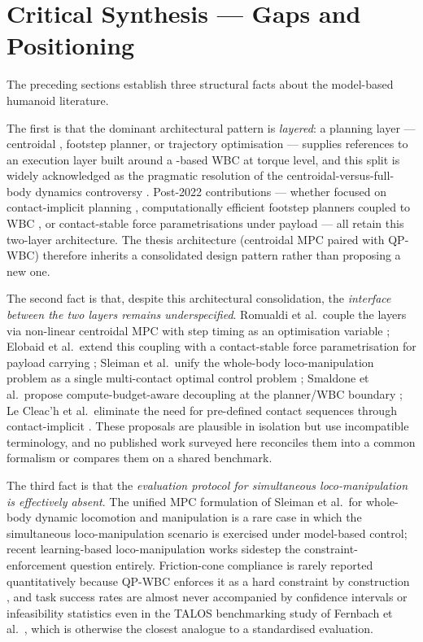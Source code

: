 \section{Critical Synthesis --- Gaps and Positioning}
\label{sec:sota_synthesis}

The preceding sections establish three structural facts about the
model-based humanoid \WBC{} literature.

The first is that the dominant architectural pattern is \emph{layered}:
a planning layer --- centroidal \MPC{}, footstep planner, or trajectory
optimisation --- supplies references to an execution layer built around
a \QP-based WBC at torque level, and this split is widely acknowledged
as the pragmatic resolution of the centroidal-versus-full-body dynamics
controversy \cite{Wensing2013,Koolen2016,Caron2019,Romualdi2023,Elobaid2023}.
Post-2022 contributions --- whether focused on contact-implicit planning
\cite{LeCleach2024,Kim2025CI}, computationally
efficient footstep planners coupled to WBC \cite{Smaldone2025}, or
contact-stable force parametrisations under payload \cite{Elobaid2023}
--- all retain this two-layer architecture. The thesis architecture
(centroidal MPC paired with QP-WBC) therefore inherits a consolidated
design pattern rather than proposing a new one.

The second fact is that, despite this architectural consolidation, the
\emph{interface between the two layers remains underspecified}.
Romualdi et al.\ couple the layers via non-linear centroidal MPC with
step timing as an optimisation variable \cite{Romualdi2023}; Elobaid
et al.\ extend this coupling with a contact-stable force parametrisation
for payload carrying \cite{Elobaid2023}; Sleiman et al.\ unify the
whole-body loco-manipulation problem as a single multi-contact optimal
control problem \cite{Sleiman2021}; Smaldone et al.\ propose
compute-budget-aware decoupling at the planner/WBC boundary
\cite{Smaldone2025}; Le Cleac'h et al.\ eliminate the need for
pre-defined contact sequences through contact-implicit \MPC{}
\cite{LeCleach2024}. These proposals are plausible in isolation but use
incompatible terminology, and no published work surveyed here reconciles
them into a common formalism or compares them on a shared benchmark.

The third fact is that the \emph{evaluation protocol for simultaneous
loco-manipulation is effectively absent}. The unified MPC formulation of
Sleiman et al.\ for whole-body dynamic locomotion and manipulation
\cite{Sleiman2021} is a rare case in which the simultaneous
loco-manipulation scenario is exercised under model-based control;
recent learning-based loco-manipulation works
\cite{Radosavovic2024,Sferrazza2024} sidestep the constraint-enforcement
question entirely. Friction-cone compliance is rarely reported
quantitatively because QP-WBC enforces it as a hard constraint by
construction \cite{Wensing2013,Koolen2016}, and task success rates are
almost never accompanied by confidence intervals or infeasibility
statistics even in the TALOS benchmarking study of Fernbach et al.\
\cite{Fernbach2018}, which is otherwise the closest analogue to a
standardised evaluation.

